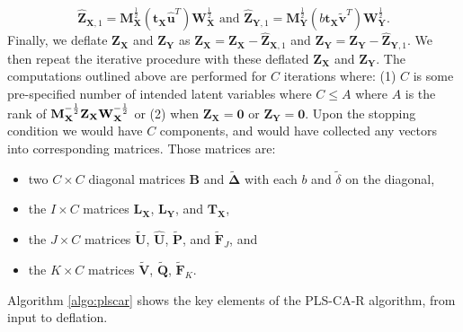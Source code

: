 \documentclass[12pt]{article}
\begin{document}
\begin{equation}
\widehat{\mathbf Z}_{{\mathbf X},1} = {\mathbf M}_{\mathbf X}^{\frac{1}{2}}({\mathbf t}_{\mathbf X}\widehat{\mathbf u}^{T}){\mathbf W}_{\mathbf X}^{\frac{1}{2}} \text{ and } \widehat{\mathbf Z}_{{\mathbf Y},1} = {\mathbf M}_{\mathbf Y}^{\frac{1}{2}}(b{\mathbf t}_{\mathbf X}\widetilde{\mathbf v}^{T}){\mathbf W}_{\mathbf Y}^{\frac{1}{2}}.
\label{eq:rank1_preds_plscar}
\end{equation} Finally, we deflate \({\mathbf Z}_{\mathbf X}\) and
\({\mathbf Z}_{\mathbf Y}\) as
\({\mathbf Z}_{\mathbf X} = {\mathbf Z}_{\mathbf X} - \widehat{\mathbf Z}_{{\mathbf X},1}\)
and
\({\mathbf Z}_{\mathbf Y} = {\mathbf Z}_{\mathbf Y} - \widehat{\mathbf Z}_{{\mathbf Y},1}\).
We then repeat the iterative procedure with these deflated
\({\mathbf Z}_{\mathbf X}\) and \({\mathbf Z}_{\mathbf Y}\). The
computations outlined above are performed for \(C\) iterations where:
(1) \(C\) is some pre-specified number of intended latent variables
where \(C \leq A\) where \(A\) is the rank of
\({\bf M}_{\bf X}^{-\frac{1}{2}}{\mathbf Z}_{\mathbf X}{\bf W}_{\bf X}^{-\frac{1}{2}}\)
or (2) when \({\mathbf Z}_{\mathbf X} = {\mathbf 0}\) or
\({\mathbf Z}_{\mathbf Y} = {\mathbf 0}\). Upon the stopping condition
we would have \(C\) components, and would have collected any vectors
into corresponding matrices. Those matrices are:

\begin{itemize}
\item
  two \(C \times C\) diagonal matrices \({\mathbf B}\) and
  \(\widetilde{\boldsymbol \Delta}\) with each \(b\) and
  \(\tilde\delta\) on the diagonal,
\item
  the \(I \times C\) matrices \({\mathbf L}_{\mathbf X}\),
  \({\mathbf L}_{\mathbf Y}\), and \({\mathbf T}_{\mathbf X}\),
\item
  the \(J \times C\) matrices \(\widetilde{\mathbf U}\),
  \(\widehat{\mathbf U}\), \(\widetilde{\mathbf P}\), and
  \(\widetilde{\mathbf F}_{J}\), and
\item
  the \(K \times C\) matrices \(\widetilde{\mathbf V}\),
  \(\widetilde{\mathbf Q}\), \(\widetilde{\mathbf F}_{K}\).
\end{itemize}

Algorithm \ref{algo:plscar} shows the key elements of the PLS-CA-R
algorithm, from input to deflation.
\end{document}
